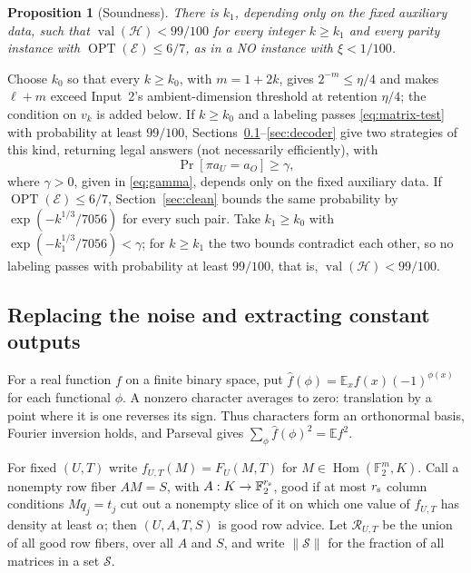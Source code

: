 \documentclass[11pt]{article}
\newtheorem{proposition}[theorem]{Proposition}
\newcommand{\E}{\mathbb E}
\newcommand{\F}{\mathbb F}
\newcommand{\Hom}{\operatorname{Hom}}
\newcommand{\val}{\operatorname{val}}
\newcommand{\OPT}{\operatorname{OPT}}
\begin{document}
\begin{proposition}[Soundness]\label{prop:sound}
There is $k_1$, depending only on the fixed auxiliary data, such that
$\val(\mathcal H)<99/100$ for every integer $k\ge k_1$ and every parity
instance with $\OPT(\mathcal E)\le6/7$, as in a NO instance with $\xi<1/100$.
\end{proposition}

\noindent Choose $k_0$ so that every $k\ge k_0$, with $m=1+2k$, gives
$2^{-m}\le\eta/4$ and makes $\ell+m$ exceed Input~2's ambient-dimension
threshold at retention $\eta/4$; the condition on $v_k$ is added below.
If $k\ge k_0$ and a labeling passes \eqref{eq:matrix-test} with probability
at least $99/100$, Sections~\ref{sec:noise}--\ref{sec:decoder} give two
strategies of this kind, returning legal answers (not necessarily
efficiently), with
\begin{equation}\label{eq:agreement}
 \Pr[\pi a_U=a_O]\ge\gamma,
\end{equation}
where $\gamma>0$, given in \eqref{eq:gamma}, depends only on the fixed
auxiliary data. If $\OPT(\mathcal E)\le6/7$, Section~\ref{sec:clean} bounds
the same probability by $\exp(-k^{1/3}/7056)$ for every such pair. Take
$k_1\ge k_0$ with $\exp(-k_1^{1/3}/7056)<\gamma$; for $k\ge k_1$ the two
bounds contradict each other, so no labeling passes with probability at
least $99/100$, that is, $\val(\mathcal H)<99/100$.

\subsection{Replacing the noise and extracting constant outputs}\label{sec:noise}

For a real function $f$ on a finite binary space, put
$\widehat f(\phi)=\E_x f(x)(-1)^{\phi(x)}$ for each functional $\phi$.
A nonzero character averages to zero: translation by a point where it is
one reverses its sign. Thus characters form an orthonormal basis, Fourier
inversion holds, and Parseval gives $\sum_\phi\widehat f(\phi)^2=\E f^2$.

For fixed $(U,T)$ write $f_{U,T}(M)=F_U(M,T)$ for $M\in\Hom(\F_2^m,K)$.
Call a nonempty row fiber $AM=S$, with $A:K\to\F_2^{r_{\rm s}}$, good if at
most $r_{\rm s}$ column conditions $Mq_j=t_j$ cut out a nonempty slice of it
on which one value of $f_{U,T}$ has density at least $\alpha$; then
$(U,A,T,S)$ is good row advice. Let
$\mathcal R_{U,T}$ be the union of all good row fibers, over all $A$ and $S$,
and write $\|\mathcal S\|$ for the fraction of all matrices in a set $\mathcal S$.
\end{document}
